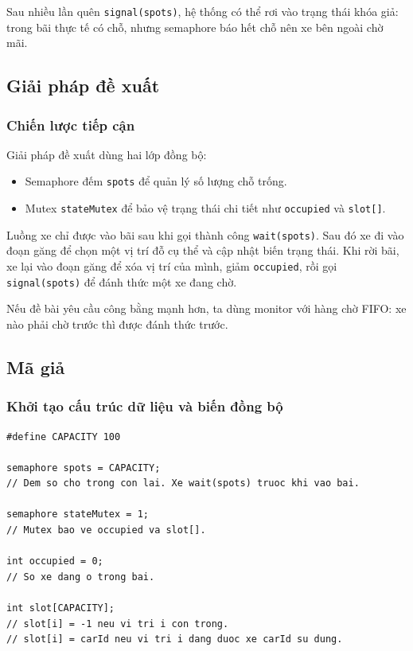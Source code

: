 Sau nhiều lần quên \texttt{signal(spots)}, hệ thống có thể rơi vào trạng
thái khóa giả: trong bãi thực tế có chỗ, nhưng semaphore báo hết chỗ nên
xe bên ngoài chờ mãi.


\subsection{Giải pháp đề xuất}

\subsubsection*{Chiến lược tiếp cận}

Giải pháp đề xuất dùng hai lớp đồng bộ:

\begin{itemize}
    \item Semaphore đếm \texttt{spots} để quản lý số lượng chỗ trống.
    \item Mutex \texttt{stateMutex} để bảo vệ trạng thái chi tiết như \texttt{occupied} và \texttt{slot[]}.
\end{itemize}

Luồng xe chỉ được vào bãi sau khi gọi thành công \texttt{wait(spots)}. Sau
đó xe đi vào đoạn găng để chọn một vị trí đỗ cụ thể và cập nhật biến trạng
thái. Khi rời bãi, xe lại vào đoạn găng để xóa vị trí của mình, giảm
\texttt{occupied}, rồi gọi \texttt{signal(spots)} để đánh thức một xe đang
chờ.

Nếu đề bài yêu cầu công bằng mạnh hơn, ta dùng monitor với hàng chờ FIFO:
xe nào phải chờ trước thì được đánh thức trước.

\subsection{Mã giả}

\subsubsection*{Khởi tạo cấu trúc dữ liệu và biến đồng bộ}

\begin{lstlisting}
#define CAPACITY 100

semaphore spots = CAPACITY;
// Dem so cho trong con lai. Xe wait(spots) truoc khi vao bai.

semaphore stateMutex = 1;
// Mutex bao ve occupied va slot[].

int occupied = 0;
// So xe dang o trong bai.

int slot[CAPACITY];
// slot[i] = -1 neu vi tri i con trong.
// slot[i] = carId neu vi tri i dang duoc xe carId su dung.
\end{lstlisting}

